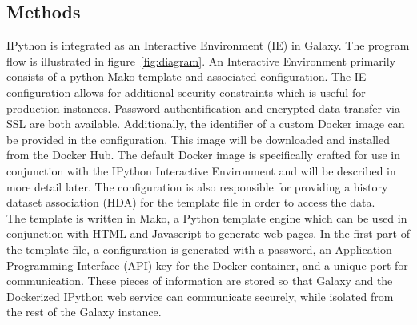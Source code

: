 \documentclass{bioinfo}
\begin{document}
\begin{methods}
\section{Methods}

IPython is integrated as an Interactive Environment (IE) in Galaxy. The program flow is illustrated in 
figure~\ref{fig:diagram}. An Interactive Environment primarily consists of a python Mako template and associated configuration. The IE configuration allows for additional security constraints which is useful
for production instances. Password authentification and encrypted data transfer via SSL are both available.
Additionally, the identifier of a custom Docker image can be provided in the configuration. This image will be downloaded and 
installed from the Docker Hub. The default Docker image is specifically crafted for use in conjunction with the
IPython Interactive Environment and will be described in more detail later. 
The configuration is also responsible for providing a history dataset 
association (HDA) for the template file in order to access the data. \\

The template is written in Mako, a Python template engine which can be used in conjunction with HTML
and Javascript to generate web pages. In the first part of the template file, a configuration is generated with a password, 
an Application Programming Interface (API) key for the Docker container, and a unique port for communication. These pieces of information are stored so that Galaxy
and the Dockerized IPython web service can communicate securely, while isolated from the rest of the Galaxy instance.


\end{methods}
\end{document}
